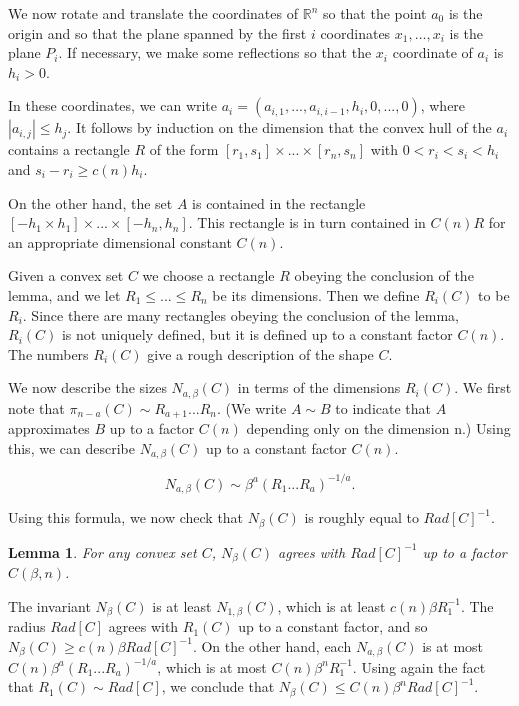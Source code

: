 \documentclass{amsart}
\newtheorem*{Theorem 1}{Theorem 1}
\newtheorem*{Theorem 2}{Theorem 2}
\newtheorem*{Theorem 1A}{Theorem 1A}
\newtheorem*{Theorem 2A}{Theorem 2A}
\newtheorem{lemma}{Lemma}[section]
\newtheorem*{vanishing lemma}{Vanishing Lemma}
\numberwithin{equation}{section}
\begin{document}
We now rotate and translate the coordinates of $\mathbb{R}^n$ so
that the point $a_0$ is the origin and so that the plane spanned
by the first $i$ coordinates $x_1, ..., x_i$ is the plane $P_i$. 
If necessary, we make some reflections so that the $x_i$
coordinate of $a_i$ is $h_i > 0$. 

In these coordinates, we can write $a_i = (a_{i,1}, ..., a_{i,
i-1}, h_i, 0, ..., 0)$, where $|a_{i,j}| \le h_j$.  It follows by
induction on the dimension that the convex hull of the $a_i$
contains a rectangle $R$ of the form $[r_1, s_1] \times ...
\times [r_n, s_n]$ with $0 < r_i < s_i < h_i$ and $s_i - r_i \ge
c(n) h_i$.

On the other hand, the set $A$ is contained in the rectangle
$[-h_1 \times h_1] \times ... \times [-h_n , h_n]$.  This
rectangle is in turn contained in $C(n) R$ for an appropriate
dimensional constant $C(n)$. \endproof

Given a convex set $C$ we choose a rectangle $R$ obeying the
conclusion of the lemma, and we let $R_1 \le ... \le R_n$ be its
dimensions.  Then we define $R_i(C)$ to be $R_i$.  Since there
are many rectangles obeying the conclusion of the lemma, $R_i(C)$
is not uniquely defined, but it is defined up to a constant
factor $C(n)$.  The numbers $R_i(C)$ give a rough description of
the shape $C$.

We now describe the sizes $N_{a, \beta}(C)$ in terms of the dimensions
$R_i(C)$. We first note that $\pi_{n-a}(C) \sim R_{a+1} ... R_n$. 
(We write $A \sim B$ to indicate that $A$ approximates $B$ up to
a factor $C(n)$ depending only on the dimension n.)  Using this,
we can describe $N_{a, \beta}(C)$ up to a constant factor $C(n)$.

$$N_{a, \beta} (C) \sim \beta^a (R_1 ... R_a)^{-1/a}.$$

Using this formula, we now check that $N_\beta(C)$ is roughly equal to
$Rad[C]^{-1}$.

\begin{lemma} For any convex set $C$, $N_{\beta}(C)$ agrees with
$Rad[C]^{-1}$ up to a factor $C(\beta, n)$.
\end{lemma}

\proof The invariant $N_{\beta}(C)$ is at least $N_{1, \beta}(C)$, which is at
least $c(n) \beta R_1^{-1}$.  The radius $Rad[C]$ agrees with
$R_1(C)$ up to a constant factor, and so $N_\beta(C) \ge c(n) \beta
Rad[C]^{-1}$.  On the other hand, each $N_{a, \beta}(C)$ is at most $C(n)
\beta^a (R_1 ... R_a)^{-1/a}$, which is at most $C(n) \beta^n
R_1^{-1}$.  Using again the fact that $R_1(C) \sim Rad[C]$, we
conclude that $N_\beta(C) \le C(n) \beta^n Rad[C]^{-1}$. \endproof
\end{document}
